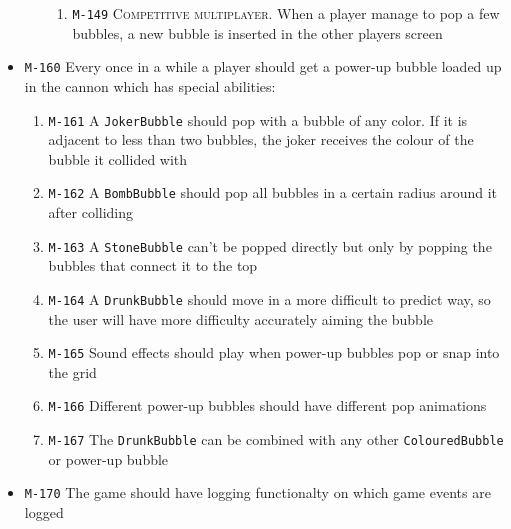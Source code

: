 \documentclass[a4paper]{article}
\begin{document}
\begin{itemize}
\begin{enumerate}
\begin{enumerate}
        \item \texttt{M-149} \textsc{Competitive multiplayer.} When a player manage to pop a few bubbles, a new bubble is inserted in the other players screen
      \end{enumerate}
  \end{enumerate}
  
  
  \item \texttt{M-160} Every once in a while a player should get a power-up bubble loaded up in the cannon which has special abilities:
  
        \begin{enumerate}
          \item \texttt{M-161} A \texttt{JokerBubble} should pop with a bubble of any color. If it is adjacent to less than two bubbles, the joker receives the colour of the bubble it collided with
          \item \texttt{M-162} A \texttt{BombBubble} should pop all bubbles in a certain radius around it after colliding
          \item \texttt{M-163} A \texttt{StoneBubble} can't be popped directly but only by popping the bubbles that connect it to the top
          \item \texttt{M-164} A \texttt{DrunkBubble} should move in a more difficult to predict way, so the user will have more difficulty accurately aiming the bubble
          \item \texttt{M-165} Sound effects should play when power-up bubbles pop or snap into the grid
          \item \texttt{M-166} Different power-up bubbles should have different pop animations
          \item \texttt{M-167} The \texttt{DrunkBubble} can be combined with any other \texttt{ColouredBubble} or power-up bubble
      \end{enumerate}
 
  
  
  
  \item \texttt{M-170} The game should have logging functionalty on which game events are logged
  

\end{itemize}
\end{document}
